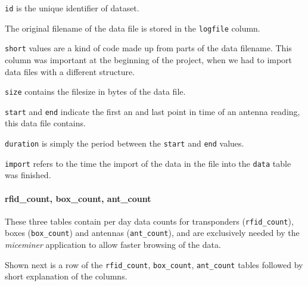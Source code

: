 \begin{mydesc}
	\item \lstinline|id| is the unique identifier of dataset.
	\item The original filename of the data file is stored in the \lstinline|logfile| column.
	\item \lstinline|short| values are a kind of code made up from parts of the data filename. This column was important at the beginning of the project, when we had to import data files with a different structure.
	\item \lstinline|size| contains the filesize in bytes of the data file.
	\item \lstinline|start| and \lstinline|end| indicate the first an and last point in time of an antenna reading, this data file contains.
	\item \lstinline|duration| is simply the period between the \lstinline|start| and \lstinline|end| values.
	\item \lstinline|import| refers to the time the import of the data in the file into the \lstinline|data| table was finished.
\end{mydesc}

\paragraph{rfid\_count, box\_count, ant\_count}
\label{para:counts}

These three tables contain per day data counts for transponders (\lstinline|rfid_count|), boxes (\lstinline|box_count|) and antennas (\lstinline|ant_count|), and are exclusively needed by the \textit{miceminer} application to allow faster browsing of the data.

Shown next is a row of the \lstinline|rfid_count|, \lstinline|box_count|, \lstinline|ant_count| tables followed by short explanation of the columns.


